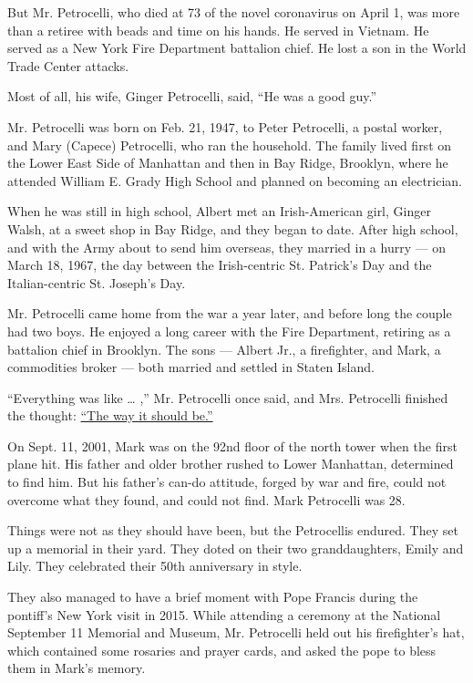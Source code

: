 But Mr. Petrocelli, who died at 73 of the novel coronavirus on April 1,
was more than a retiree with beads and time on his hands. He served in
Vietnam. He served as a New York Fire Department battalion chief. He
lost a son in the World Trade Center attacks.

Most of all, his wife, Ginger Petrocelli, said, ``He was a good guy.''

Mr. Petrocelli was born on Feb. 21, 1947, to Peter Petrocelli, a postal
worker, and Mary (Capece) Petrocelli, who ran the household. The family
lived first on the Lower East Side of Manhattan and then in Bay Ridge,
Brooklyn, where he attended William E. Grady High School and planned on
becoming an electrician.

When he was still in high school, Albert met an Irish-American girl,
Ginger Walsh, at a sweet shop in Bay Ridge, and they began to date.
After high school, and with the Army about to send him overseas, they
married in a hurry --- on March 18, 1967, the day between the
Irish-centric St. Patrick's Day and the Italian-centric St. Joseph's
Day.

Mr. Petrocelli came home from the war a year later, and before long the
couple had two boys. He enjoyed a long career with the Fire Department,
retiring as a battalion chief in Brooklyn. The sons --- Albert Jr., a
firefighter, and Mark, a commodities broker --- both married and settled
in Staten Island.

``Everything was like \ldots{} ,'' Mr. Petrocelli once said, and Mrs.
Petrocelli finished the thought:
\href{https://www.nytimes3xbfgragh.onion/2003/09/10/nyregion/about-new-york-for-one-9-11-family-five-waves-of-grief.html?searchResultPosition=2}{``The
way it should be.''}

On Sept. 11, 2001, Mark was on the 92nd floor of the north tower when
the first plane hit. His father and older brother rushed to Lower
Manhattan, determined to find him. But his father's can-do attitude,
forged by war and fire, could not overcome what they found, and could
not find. Mark Petrocelli was 28.

Things were not as they should have been, but the Petrocellis endured.
They set up a memorial in their yard. They doted on their two
granddaughters, Emily and Lily. They celebrated their 50th anniversary
in style.

They also managed to have a brief moment with Pope Francis during the
pontiff's New York visit in 2015. While attending a ceremony at the
National September 11 Memorial and Museum, Mr. Petrocelli held out his
firefighter's hat, which contained some rosaries and prayer cards, and
asked the pope to bless them in Mark's memory.


